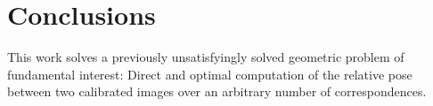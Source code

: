 \documentclass[10pt,twocolumn,letterpaper]{article}
\begin{document}
\section{Conclusions}
This work solves a previously unsatisfyingly solved geometric problem of fundamental interest: Direct and optimal computation of the relative pose between two calibrated images over an arbitrary number of correspondences.


{\small


}
\end{document}
